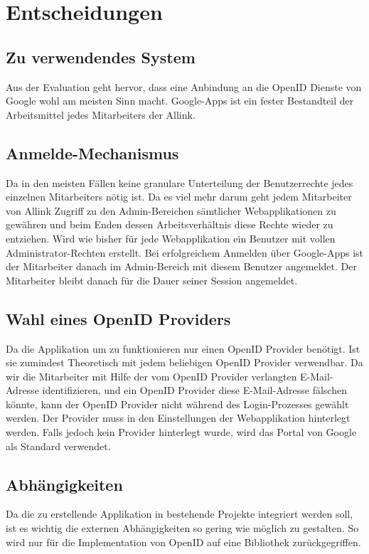 \section{Entscheidungen}
\label{sec:Entscheidungen}

\subsection{Zu verwendendes System}
\label{sub:Zu verwendendes System}
Aus der Evaluation geht hervor, dass eine Anbindung an die OpenID Dienste von Google wohl am meisten Sinn macht. Google-Apps ist ein fester Bestandteil der Arbeitsmittel jedes Mitarbeiters der Allink.

\subsection{Anmelde-Mechanismus}
\label{sub:Anmelde-Mechanismus}
Da in den meisten Fällen keine granulare Unterteilung der Benutzerrechte jedes einzelnen Mitarbeiters nötig ist. Da es viel mehr darum geht jedem Mitarbeiter von Allink Zugriff zu den Admin-Bereichen sämtlicher Webapplikationen zu gewähren und beim Enden dessen Arbeitsverhältnis diese Rechte wieder zu entziehen. Wird wie bisher für jede Webapplikation ein Benutzer mit vollen Administrator-Rechten erstellt. Bei erfolgreichem Anmelden über Google-Apps ist der Mitarbeiter danach im Admin-Bereich mit diesem Benutzer angemeldet. Der Mitarbeiter bleibt danach für die Dauer seiner Session angemeldet.

\subsection{Wahl eines OpenID Providers}
\label{sub:Wahl eines OpenID Providers}
Da die Applikation um zu funktionieren nur einen OpenID Provider benötigt. Ist sie zumindest Theoretisch mit jedem beliebigen OpenID Provider verwendbar. Da wir die Mitarbeiter mit Hilfe der vom OpenID Provider verlangten E-Mail-Adresse identifizieren, und ein OpenID Provider diese E-Mail-Adresse fälschen könnte, kann der OpenID Provider nicht während des Login-Prozesses gewählt werden. Der Provider muss in den Einstellungen der Webapplikation hinterlegt werden. Falls jedoch kein Provider hinterlegt wurde, wird das Portal von Google als Standard verwendet.

\subsection{Abhängigkeiten}
\label{sub:Abhängigkeiten}
Da die zu erstellende Applikation in bestehende Projekte integriert werden soll, ist es wichtig die externen Abhängigkeiten so gering wie möglich zu gestalten. So wird nur für die Implementation von OpenID auf eine Bibliothek zurückgegriffen.

